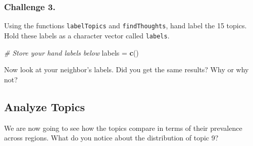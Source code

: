 \documentclass[
]{book}
\newenvironment{Shaded}{\begin{snugshade}}{\end{snugshade}}
\newcommand{\CommentTok}[1]{\textcolor[rgb]{0.56,0.35,0.01}{\textit{#1}}}
\newcommand{\KeywordTok}[1]{\textcolor[rgb]{0.13,0.29,0.53}{\textbf{#1}}}
\newcommand{\NormalTok}[1]{#1}
\newcommand{\StringTok}[1]{\textcolor[rgb]{0.31,0.60,0.02}{#1}}
\begin{document}
\hypertarget{challenge-3.-11}{%
\subsubsection*{Challenge 3.}\label{challenge-3.-11}}

Using the functions \texttt{labelTopics} and \texttt{findThoughts}, hand label the 15 topics. Hold these labels as a character vector called \texttt{labels}.

\begin{Shaded}
\begin{Highlighting}[]
\CommentTok{# Store your hand labels below}
\NormalTok{labels =}\StringTok{ }\KeywordTok{c}\NormalTok{()}
\end{Highlighting}
\end{Shaded}

Now look at your neighbor's labels. Did you get the same results? Why or why not?

\hypertarget{analyze-topics}{%
\subsection{Analyze Topics}\label{analyze-topics}}

We are now going to see how the topics compare in terms of their prevalence across regions. What do you notice about the distribution of topic 9?
\end{document}
